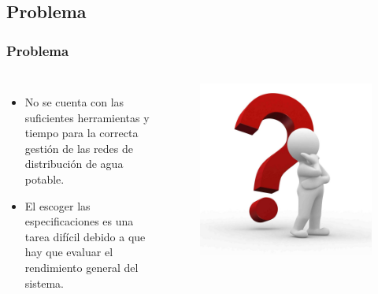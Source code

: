 \documentclass[9pt]{beamer}
\begin{document}
    \subsection{Problema}
    \begin{frame}
        \frametitle{Problema}
        
        \begin{columns}
            \begin{itemize}
                \item No se cuenta con las suficientes herramientas y tiempo para la correcta gestión de las redes de distribución de agua potable.
                \item El escoger las especificaciones es una tarea difícil debido a que hay que evaluar el rendimiento general del sistema.
            \end{itemize}

            \begin{figure}
                \includegraphics[width=\textwidth]{assets/MunecosBlancos/Aproblemado.jpg}
            \end{figure}
        \end{columns}
    \end{frame}
\end{document}
